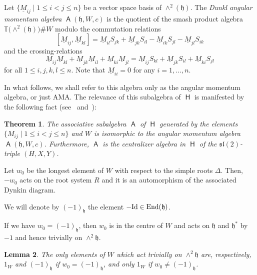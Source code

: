 \documentclass[pdftex]{sigma}
\numberwithin{equation}{section}
\newtheorem{Theorem}{Theorem}[section]
\newtheorem{Lemma}[Theorem]{Lemma}
\DeclareMathOperator{\End}{End}
\newcommand{\fh}{\mathfrak{h}}
\newcommand{\fl}{\mathfrak{l}}
\newcommand{\fs}{\mathfrak{s}}
\newcommand{\bbt}{\mathbb{T}}
\newcommand{\uM}{\underline{M}}
\DeclareMathOperator{\rca}{\mathsf{H}}
\DeclareMathOperator{\ama}{\mathsf{A}}
\begin{document}
\begin{Definition}[\cite{FH15}]\label{d:AMA}
Let $\{\uM_{ij}\mid 1\leq i<j\leq n\}$ be a vector space basis of $\wedge^2(\fh)$. The {\it Dunkl angular momentum algebra} $\ama(\fh,W,c)$ is the quotient of the smash product algebra $\bbt\big({\wedge}^2(\fh)\big)\#W$ modulo the commutation relations
\begin{equation}\label{e:agacomrel}
[\uM_{ij},\uM_{kl}] = \uM_{il}S_{jk} + \uM_{jk}S_{il}-\uM_{ik}S_{jl} - \uM_{jl}S_{ik}
\end{equation}
and the crossing-relations
\begin{equation}\label{e:agacrossrel}
\uM_{ij}\uM_{kl} + \uM_{jk}\uM_{il}+\uM_{ki}\uM_{jl} = \uM_{ij}S_{kl} + \uM_{jk}S_{il}+\uM_{ki}S_{jl}
\end{equation}
for all $1\leq i,j,k,l \leq n$.
Note that $\uM_{ii} = 0$ for any $i = 1,\dots, n$.
\end{Definition}

In what follows, we shall refer to this algebra only as the angular momentum algebra, or just AMA. The relevance of this subalgebra of $\rca$ is manifested by the following fact (see~\cite{FH15} and~\cite{CDM20}):

\begin{Theorem}\label{t:Centre}
The associative subalgebra $\ama$ of $\rca$ generated by the elements $\{M_{ij}\mid 1\leq i<j \leq n\}$ and $W$ is isomorphic to the angular momentum algebra $\ama(\fh,W,c)$. Furthermore, $\ama$ is the centralizer algebra in $\rca$ of the $\fs\fl(2)$-triple $(H,X,Y)$.
\end{Theorem}

Let $w_0$ be the longest element of $W$ with respect to the simple roots $\Delta$. Then, $-w_0$ acts on the root system $R$ and it is an automorphism of the associated Dynkin diagram.

\begin{Definition}
We will denote by $(-1)_\fh$ the element $-{\rm Id}\in\End(\fh)$.
\end{Definition}

\begin{Remark}
If we have $w_0=(-1)_\fh$, then $w_0$ is in the centre of $W$ and acts on $\mathfrak{h}$ and $\mathfrak{h}^*$
 by~$-1$ and hence trivially on $\wedge^2\mathfrak{h}$.
\end{Remark}

\begin{Lemma}\label{r:schurorth}
The only elements of $W$ which act trivially on $\wedge^2\mathfrak{h}$ are, respectively, $1_W$ and $(-1)_\fh$ if $w_0 = (-1)_\fh$, and only $1_W$ if $w_0\neq (-1)_\fh$.
\end{Lemma}
\end{document}
